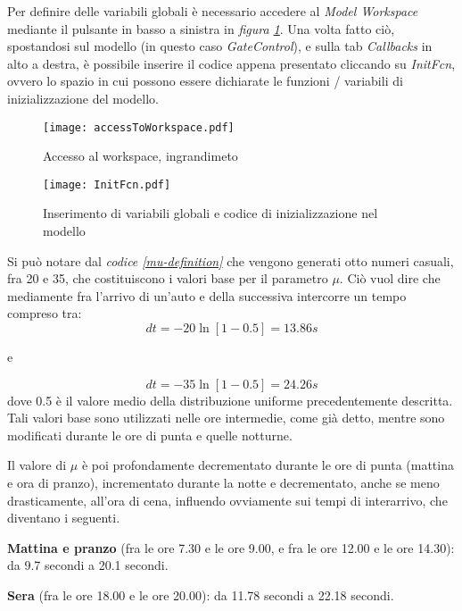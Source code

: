 Per definire delle variabili globali è necessario accedere al \textit{Model Workspace} mediante il pulsante in basso a sinistra in \textit{figura \ref{fig:accesstoworkspace}}. Una volta fatto ciò, spostandosi sul modello (in questo caso \textit{GateControl}), e sulla tab \textit{Callbacks} in alto a destra, è possibile inserire il codice appena presentato cliccando su \textit{InitFcn}, ovvero lo spazio in cui possono essere dichiarate le funzioni / variabili di inizializzazione del modello.

\begin{figure}[H]
  \texttt{[image: accessToWorkspace.pdf]}
  \caption{Accesso al workspace, ingrandimeto}
  \label{fig:accesstoworkspace}
\end{figure}

\begin{figure}[H]
  \texttt{[image: InitFcn.pdf]}
  \caption{Inserimento di variabili globali e codice di inizializzazione nel modello}
  \label{fig:initfcn}
\end{figure}

Si può notare dal \textit{codice \ref{mu-definition}} che vengono generati otto numeri casuali, fra 20 e 35, che costituiscono i valori base per il parametro $\mu$. Ciò vuol dire che mediamente fra l’arrivo di un’auto e della successiva intercorre un tempo compreso tra:
\begin{equation*}
	dt = -20 \ln{[1 - 0.5]} = 13.86s
\end{equation*} 
\begin{center}
	e
\end{center}
\begin{equation*}
dt = -35 \ln{[1 - 0.5]} = 24.26s
\end{equation*}
dove 0.5 è il valore medio della distribuzione uniforme precedentemente descritta. Tali valori base sono utilizzati nelle ore intermedie, come già detto, mentre sono modificati durante le ore di punta e quelle notturne.

Il valore di $\mu$ è poi profondamente decrementato durante le ore di punta (mattina e ora di pranzo), incrementato durante la notte e decrementato, anche se meno drasticamente, all’ora di cena, influendo ovviamente sui tempi di interarrivo, che diventano i seguenti.

\textbf{Mattina e pranzo} (fra le ore 7.30 e le ore 9.00, e fra le ore 12.00 e le ore 14.30): da 9.7 secondi a 20.1 secondi.

\textbf{Sera} (fra le ore 18.00 e le ore 20.00): da 11.78 secondi a 22.18 secondi.

